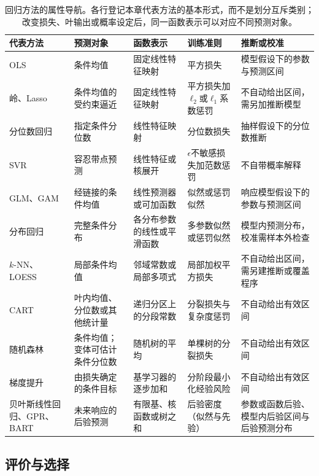 \begin{table}[htbp]
  \centering
  \small
  \begin{tabularx}{\linewidth}{@{}>{\RaggedRight\arraybackslash}p{25mm}>{\RaggedRight\arraybackslash}X>{\RaggedRight\arraybackslash}X>{\RaggedRight\arraybackslash}X>{\RaggedRight\arraybackslash}X@{}}
    \toprule
    代表方法 & 预测对象 & 函数表示 & 训练准则 & 推断或校准 \\
    \midrule
    OLS & 条件均值 & 固定线性特征映射 & 平方损失 & 模型假设下的参数与预测区间 \\
    岭、Lasso & 条件均值的受约束逼近 & 固定线性特征映射 & 平方损失加$\ell_2$或$\ell_1$系数惩罚 & 不自动给出区间，需另加推断模型 \\
    分位数回归 & 指定条件分位数 & 线性特征映射 & 分位数损失 & 抽样假设下的分位数推断 \\
    SVR & 容忍带点预测 & 线性特征或核展开 & $\epsilon$不敏感损失加范数惩罚 & 不自带概率解释 \\
    GLM、GAM & 经链接的条件均值 & 线性预测器或可加函数 & 似然或惩罚似然 & 响应模型假设下的参数与预测区间 \\
    分布回归 & 完整条件分布 & 各分布参数的线性或平滑函数 & 多参数似然或惩罚似然 & 模型内预测分布，校准需样本外检查 \\
    $k$-NN、LOESS & 局部条件均值 & 邻域常数或局部多项式 & 局部加权平方损失 & 不自动给出区间，需另建推断或覆盖程序 \\
    CART & 叶内均值、分位数或其他统计量 & 递归分区上的分段常数 & 分裂损失与复杂度惩罚 & 不自动给出有效区间 \\
    随机森林 & 条件均值；变体可估计条件分位数 & 随机树的平均 & 单棵树的分裂损失 & 不自动给出有效区间 \\
    梯度提升 & 由损失确定的条件目标 & 基学习器的逐步加和 & 分阶段最小化经验风险 & 不自动给出有效区间 \\
    贝叶斯线性回归、GPR、BART & 未来响应的后验预测 & 有限基、核函数或树之和 & 后验密度（似然与先验） & 参数或函数后验、模型内后验区间与后验预测分布 \\
    \bottomrule
  \end{tabularx}
  \caption{回归方法的属性导航。各行登记本章代表方法的基本形式，而不是划分互斥类别；改变损失、叶输出或概率设定后，同一函数表示可以对应不同预测对象。}
  \label{tab:regression-navigation}
\end{table}

\subsection{评价与选择}

